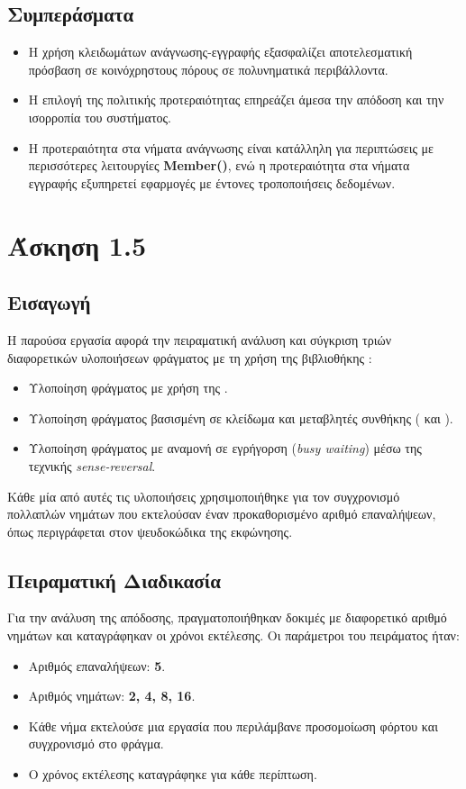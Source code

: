\documentclass{article}
\begin{document}
\subsection*{Συμπεράσματα}
\begin{itemize}
    \item Η χρήση κλειδωμάτων ανάγνωσης-εγγραφής εξασφαλίζει αποτελεσματική πρόσβαση σε κοινόχρηστους πόρους σε πολυνηματικά περιβάλλοντα.
    \item Η επιλογή της πολιτικής προτεραιότητας επηρεάζει άμεσα την απόδοση και την ισορροπία του συστήματος.
    \item Η προτεραιότητα στα νήματα ανάγνωσης είναι κατάλληλη για περιπτώσεις με περισσότερες λειτουργίες \textbf{Member()}, ενώ η προτεραιότητα στα νήματα εγγραφής εξυπηρετεί εφαρμογές με έντονες τροποποιήσεις δεδομένων.
\end{itemize}
\section*{Άσκηση 1.5} 
\subsection*{Εισαγωγή} 
Η παρούσα εργασία αφορά την πειραματική ανάλυση και σύγκριση τριών διαφορετικών υλοποιήσεων φράγματος με τη χρήση της βιβλιοθήκης : 
\begin{itemize} 
    \item Υλοποίηση φράγματος με χρήση της . 
    \item Υλοποίηση φράγματος βασισμένη σε κλείδωμα και μεταβλητές συνθήκης ( και ). 
    \item Υλοποίηση φράγματος με αναμονή σε εγρήγορση (\textit{busy waiting}) μέσω της τεχνικής \textit{sense-reversal}. 
\end{itemize} 
Κάθε μία από αυτές τις υλοποιήσεις χρησιμοποιήθηκε για τον συγχρονισμό πολλαπλών νημάτων που εκτελούσαν έναν προκαθορισμένο αριθμό επαναλήψεων, όπως περιγράφεται στον ψευδοκώδικα της εκφώνησης.
\subsection*{Πειραματική Διαδικασία}
Για την ανάλυση της απόδοσης, πραγματοποιήθηκαν δοκιμές με διαφορετικό αριθμό νημάτων και καταγράφηκαν οι χρόνοι εκτέλεσης. 
Οι παράμετροι του πειράματος ήταν: 
\begin{itemize} 
    \item Αριθμός επαναλήψεων: \textbf{5}. 
    \item Αριθμός νημάτων: \textbf{2, 4, 8, 16}. 
    \item Κάθε νήμα εκτελούσε μια εργασία που περιλάμβανε προσομοίωση φόρτου και συγχρονισμό στο φράγμα. 
    \item Ο χρόνος εκτέλεσης καταγράφηκε για κάθε περίπτωση. 
\end{itemize}
\end{document}
